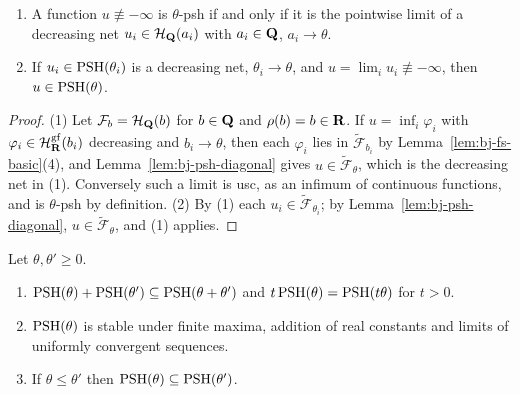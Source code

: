\begin{theorem}\label{thm:bj-psh2}
\leanok
{}
\begin{enumerate}
\item A function $u\not\equiv-\infty$ is $\theta$-psh if and only if it is the pointwise limit of a
decreasing net $u_i\in\mathcal H_{\mathbf{Q}}(a_i)$ with $a_i\in\mathbf{Q}$, $a_i\to\theta$.
\item If $u_i\in\operatorname{PSH}(\theta_i)$ is a decreasing net, $\theta_i\to\theta$, and $u=\lim_iu_i\not\equiv-\infty$,
then $u\in\operatorname{PSH}(\theta)$.
\end{enumerate}
\end{theorem}

\begin{proof}
(1) Let $\mathcal F_b=\mathcal H_{\mathbf{Q}}(b)$ for $b\in\mathbf{Q}$ and $\rho(b)=b\in\mathbf{R}$. If $u=\inf_i\varphi_i$ with
$\varphi_i\in\mathcal H^{\mathrm{gf}}_{\mathbf{R}}(b_i)$ decreasing and $b_i\to\theta$, then each $\varphi_i$ lies in
$\widetilde{\mathcal F}_{b_i}$ by Lemma~\ref{lem:bj-fs-basic}(4), and Lemma~\ref{lem:bj-psh-diagonal} gives
$u\in\widetilde{\mathcal F}_\theta$, which is the decreasing net in (1). Conversely such a limit is usc, as an
infimum of continuous functions, and is $\theta$-psh by definition. (2) By (1) each $u_i\in\widetilde{\mathcal F}_{\theta_i}$; by
Lemma~\ref{lem:bj-psh-diagonal}, $u\in\widetilde{\mathcal F}_\theta$, and (1) applies.
\end{proof}

\begin{theorem}\label{thm:bj-psh-basic}
\leanok
{}
Let $\theta,\theta'\ge0$.
\begin{enumerate}
\item $\operatorname{PSH}(\theta)+\operatorname{PSH}(\theta')\subseteq\operatorname{PSH}(\theta+\theta')$ and $t\operatorname{PSH}(\theta)=\operatorname{PSH}(t\theta)$ for $t>0$.
\item $\operatorname{PSH}(\theta)$ is stable under finite maxima, addition of real constants and limits of uniformly
convergent sequences.
\item If $\theta\le\theta'$ then $\operatorname{PSH}(\theta)\subseteq\operatorname{PSH}(\theta')$.
\end{enumerate}
\end{theorem}

